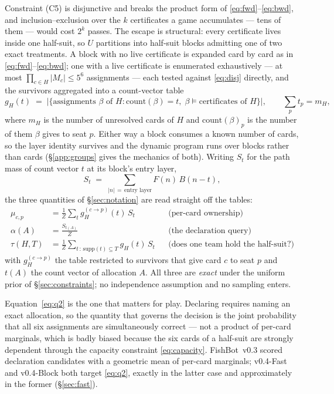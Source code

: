 \documentclass[11pt]{article}
\theoremstyle{definition}
\DeclareRobustCommand{\vfast}{\texorpdfstring{\mbox{v0.4-Fast}}{v0.4-Fast}}
\DeclareRobustCommand{\vblock}{\texorpdfstring{\mbox{v0.4-Block}}{v0.4-Block}}
\DeclareRobustCommand{\vthree}{\texorpdfstring{\mbox{FishBot v0.3}}{FishBot v0.3}}
\begin{document}
Constraint (C5) is disjunctive and breaks the product form of
\eqref{eq:fwd}--\eqref{eq:bwd}, and inclusion--exclusion over the $k$
certificates a game accumulates --- tens of them --- would cost $2^k$ passes. The
escape is structural: every certificate lives inside one half-suit, so $U$
partitions into half-suit blocks admitting one of two exact treatments. A block with no live
certificate is expanded card by card as in \eqref{eq:fwd}--\eqref{eq:bwd}; one
with a live certificate is enumerated exhaustively --- at most
$\prod_{c \in H}|M_c| \le 5^6$ assignments --- each tested against
\eqref{eq:disj} directly, and the survivors aggregated into a count-vector
table
\begin{equation}
  g_H(t) \;=\; \bigl|\{\text{assignments } \beta \text{ of } H :
    \mathrm{count}(\beta) = t,\; \beta \models \text{certificates of } H\}\bigr|,
  \qquad \textstyle\sum_p t_p = m_H ,
  \label{eq:blocktable}
\end{equation}
where $m_H$ is the number of unresolved cards of $H$ and
$\mathrm{count}(\beta)_p$ is the number of them $\beta$ gives to seat $p$. Either
way a block consumes a known number of cards, so the layer identity survives and
the dynamic program runs over blocks rather than cards (\S\ref{app:groups} gives
the mechanics of both). Writing $S_t$ for the path mass of count vector $t$ at
its block's entry layer,
\begin{equation}
  S_t \;=\; \sum_{|n| \,=\, \text{entry layer}} F(n)\, B(n - t),
  \label{eq:pathmass}
\end{equation}
the three quantities of \S\ref{sec:notation} are read straight off the tables:
\begin{align}
  \mu_{c,p} &= \frac{1}{Z}\sum_t g_H^{(c \to p)}(t)\, S_t
  &&\text{(per-card ownership)} \label{eq:q1}\\
  \alpha(A) &= \frac{S_{t(A)}}{Z}
  &&\text{(the declaration query)} \label{eq:q2}\\
  \tau(H,T) &= \frac{1}{Z}\sum_{t \,:\, \mathrm{supp}(t) \subseteq T} g_H(t)\, S_t
  &&\text{(does one team hold the half-suit?)} \label{eq:q3}
\end{align}
with $g_H^{(c \to p)}$ the table restricted to survivors that give card $c$ to
seat $p$ and $t(A)$ the count vector of allocation $A$. All three are
\emph{exact} under the uniform prior of \S\ref{sec:constraints}; no
independence assumption and no sampling enters.

Equation~\eqref{eq:q2} is the one that matters for play. Declaring requires
naming an exact allocation, so the quantity that governs the decision is the
joint probability that all six assignments are simultaneously correct --- not
a product of per-card marginals, which is badly biased because the six cards
of a half-suit are strongly dependent through the capacity constraint
\eqref{eq:capacity}. \vthree{} scored declaration candidates with a geometric
mean of per-card marginals; \vfast{} and \vblock{} both target \eqref{eq:q2},
exactly in the latter case and approximately in the former (\S\ref{sec:fast}).
\end{document}
